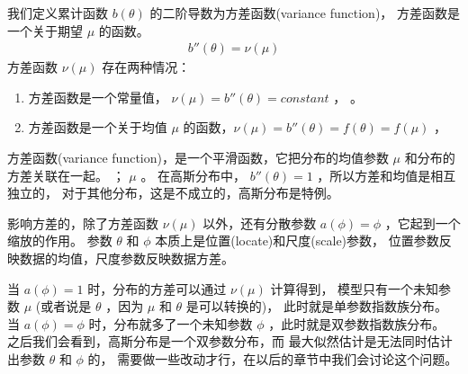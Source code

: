 \documentclass[letterpaper,10pt,english]{sphinxmanual}
\begin{document}
我们定义累计函数 \(b(\theta)\) 的二阶导数为方差函数(variance function)，
方差函数是一个关于期望 \(\mu\) 的函数。
\begin{equation}\label{equation:广义线性模型/content:广义线性模型/content:7}
\begin{split}b''(\theta) = \nu(\mu)\end{split}
\end{equation}
方差函数 \(\nu(\mu)\) 存在两种情况：
\begin{enumerate}
%
\item {} 
方差函数是一个常量值， \(\nu(\mu)=b''(\theta)=constant\) ， 。

\item {} 
方差函数是一个关于均值 \(\mu\) 的函数，\(\nu(\mu)=b''(\theta)=f(\theta)=f(\mu)\) ，

\end{enumerate}

方差函数(variance function)，是一个平滑函数，它把分布的均值参数 \(\mu\)
和分布的方差关联在一起。
；
 \(\mu\) 。
在高斯分布中， \(b''(\theta)=1\) ，所以方差和均值是相互独立的，
对于其他分布，这是不成立的，高斯分布是特例。

影响方差的，除了方差函数 \(\nu(\mu)\) 以外，还有分散参数 \(a(\phi)=\phi\)
，它起到一个缩放的作用。
参数 \(\theta\) 和 \(\phi\) 本质上是位置(locate)和尺度(scale)参数，
位置参数反映数据的均值，尺度参数反映数据方差。

当 \(a(\phi)=1\) 时，分布的方差可以通过 \(\nu(\mu)\) 计算得到，
模型只有一个未知参数 \(\mu\) (或者说是 \(\theta\) ，因为 \(\mu\) 和 \(\theta\) 是可以转换的)，
此时就是单参数指数族分布。
当 \(a(\phi)=\phi\) 时，分布就多了一个未知参数 \(\phi\)
，此时就是双参数指数族分布。
之后我们会看到，高斯分布是一个双参数分布，而
最大似然估计是无法同时估计出参数 \(\theta\) 和 \(\phi\) 的，
需要做一些改动才行，在以后的章节中我们会讨论这个问题。
\end{document}
